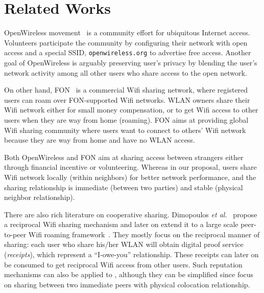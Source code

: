 \section{Related Works}
\label{sec:related}

OpenWireless movement~\cite{openwireless} is a community effort for ubiquitous
Internet access. Volunteers participate the community by configuring their
\wifi{} network with open access and a special SSID, \texttt{openwireless.org}
to advertise free access. Another goal of OpenWireless is arguably preserving user's
privacy by blending the user's network activity among all other users who share
access to the open \wifi{} network.

On other hand, FON~\cite{fon} is a commercial Wifi sharing network, where
registered users can roam over FON-supported Wifi networks. WLAN owners share
their Wifi network either for small money compensation, or to get Wifi access to
other users when they are way from home (roaming). FON aims at providing global
Wifi sharing community where users want to connect to others' Wifi network
because they are way from home and have no WLAN access. 

Both OpenWireless and FON aim at sharing \wifi{} access between strangers either
through financial incentive or volunteering. Whereas in our proposal, users share
Wifi network locally (within neighbors) for better network performance, and the
sharing relationship is immediate (between two parties) and stable (physical
neighbor relationship).

There are also rich literature on cooperative \wifi{} sharing. Dimopoulos
\textit{et al.}~\cite{efstathiou2010controlled} propose a reciprocal Wifi
sharing mechanism and later on extend it to a large scale peer-to-peer Wifi
roaming framework~\cite{dimopoulos2010exploiting}. They mostly focus on the
reciprocal manner of sharing: each user who share his/her WLAN will obtain
digital proof service (\textit{receipts}), which represent a ``I-owe-you''
relationship. These receipts can later on be consumed to get reciprocal Wifi
access from other users. Such reputation mechanisms can also be applied to
\wisefi{}, although they can be simplified since \wisief{} focus on sharing
between two immediate peers with physical colocation relationship.
